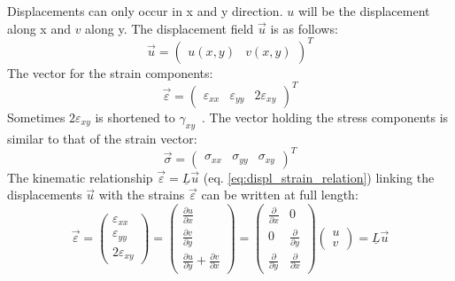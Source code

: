   Displacements can only occur in x and y direction. $u$ will be the displacement along x and $v$ along y. The displacement field $\vec{u}$ is as follows:
  \begin{equation}
  \vec{u}=\begin{pmatrix}
  u(x,y) & v(x,y)
  \end{pmatrix}^T
  \end{equation}
  The vector for the strain components:
  \begin{equation}
  \vec{\varepsilon}=\begin{pmatrix}
  \varepsilon_{xx} & \varepsilon_{yy} & 2\varepsilon_{xy}
  \end{pmatrix}^T
  \end{equation}
  Sometimes $2\varepsilon_{xy}$ is shortened to $\gamma_{xy}$~\cite{steinke2005finite}.
  The vector holding the stress components is similar to that of the strain vector:
  \begin{equation}
  \vec{\sigma}=\begin{pmatrix}
  \sigma_{xx} & \sigma_{yy} & \sigma_{xy}
  \end{pmatrix}^T
  \end{equation}
  The kinematic relationship $\vec{\varepsilon}=\underline{L}\vec{u}$ (eq. \eqref{eq:displ_strain_relation}) linking the displacements $\vec{u}$ with the strains $\vec{\varepsilon}$ can be written at full length:
  \begin{equation}\label{eq:t3displ-str-rel}
  \vec{\varepsilon} = \begin{pmatrix}
  \varepsilon_{xx} \\
  \varepsilon_{yy} \\
  2\varepsilon_{xy}
  \end{pmatrix} =
  \begin{pmatrix}
  \frac{\partial u}{\partial x} \\
  \frac{\partial v}{\partial y} \\
  \frac{\partial u}{\partial y} + \frac{\partial v}{\partial x}
  \end{pmatrix} =
  \begin{pmatrix}
  \frac{\partial}{\partial x} & 0 \\
  0 & \frac{\partial}{\partial y} \\
  \frac{\partial}{\partial y} & \frac{\partial}{\partial x}
  \end{pmatrix}
  \begin{pmatrix}
  u \\
  v
  \end{pmatrix}
  = \underline{L} \vec{u}
  \end{equation}
